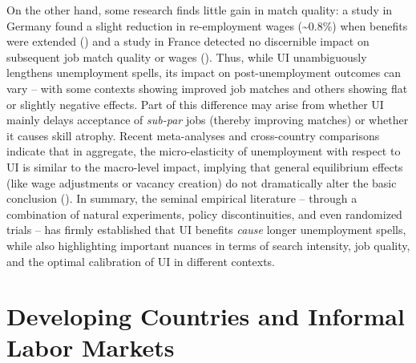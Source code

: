 \documentclass[
  4pt,
]{report}
\begin{document}
On the other hand, some research finds little gain in match quality: a
study in Germany found a slight reduction in re-employment wages
(\textasciitilde0.8\%) when benefits were extended
() and a study
in France detected no discernible impact on subsequent job match quality
or wages (). Thus,
while UI unambiguously lengthens unemployment spells, its impact on
post-unemployment outcomes can vary -- with some contexts showing
improved job matches and others showing flat or slightly negative
effects. Part of this difference may arise from whether UI mainly delays
acceptance of \emph{sub-par} jobs (thereby improving matches) or whether
it causes skill atrophy. Recent meta-analyses and cross-country
comparisons indicate that in aggregate, the micro-elasticity of
unemployment with respect to UI is similar to the macro-level impact,
implying that general equilibrium effects (like wage adjustments or
vacancy creation) do not dramatically alter the basic conclusion
(). In summary, the
seminal empirical literature -- through a combination of natural
experiments, policy discontinuities, and even randomized trials -- has
firmly established that UI benefits \emph{cause} longer unemployment
spells, while also highlighting important nuances in terms of search
intensity, job quality, and the optimal calibration of UI in different
contexts.

\section{Developing Countries and Informal Labor
Markets}\label{developing-countries-and-informal-labor-markets}
\end{document}
